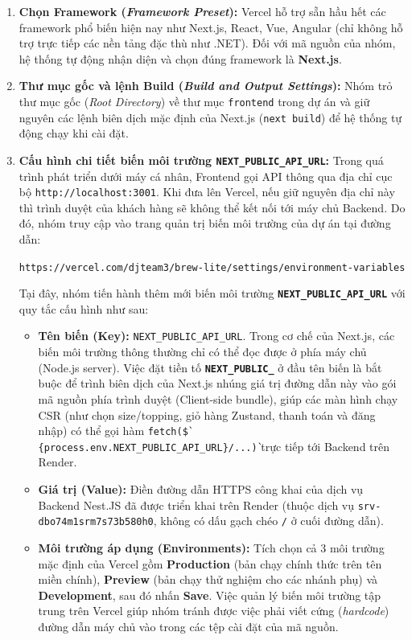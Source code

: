 \begin{enumerate}
    \item \textbf{Chọn Framework (\textit{Framework Preset}):} Vercel hỗ trợ sẵn hầu hết các framework phổ biến hiện nay như Next.js, React, Vue, Angular (chỉ không hỗ trợ trực tiếp các nền tảng đặc thù như .NET). Đối với mã nguồn của nhóm, hệ thống tự động nhận diện và chọn đúng framework là \textbf{Next.js}.
    \item \textbf{Thư mục gốc và lệnh Build (\textit{Build and Output Settings}):} Nhóm trỏ thư mục gốc (\textit{Root Directory}) về thư mục \texttt{frontend} trong dự án và giữ nguyên các lệnh biên dịch mặc định của Next.js (\texttt{next build}) để hệ thống tự động chạy khi cài đặt.
    \item \textbf{Cấu hình chi tiết biến môi trường \texttt{NEXT\_PUBLIC\_API\_URL}:}
    Trong quá trình phát triển dưới máy cá nhân, Frontend gọi API thông qua địa chỉ cục bộ \texttt{http://localhost:3001}. Khi đưa lên Vercel, nếu giữ nguyên địa chỉ này thì trình duyệt của khách hàng sẽ không thể kết nối tới máy chủ Backend. Do đó, nhóm truy cập vào trang quản trị biến môi trường của dự án tại đường dẫn:
    \begin{center}
    \texttt{https://vercel.com/djteam3/brew-lite/settings/environment-variables}
    \end{center}
    Tại đây, nhóm tiến hành thêm mới biến môi trường \textbf{\texttt{NEXT\_PUBLIC\_API\_URL}} với quy tắc cấu hình như sau:
    \begin{itemize}
        \item \textbf{Tên biến (Key):} \texttt{NEXT\_PUBLIC\_API\_URL}. Trong cơ chế của Next.js, các biến môi trường thông thường chỉ có thể đọc được ở phía máy chủ (Node.js server). Việc đặt tiền tố \textbf{\texttt{NEXT\_PUBLIC\_}} ở đầu tên biến là bắt buộc để trình biên dịch của Next.js nhúng giá trị đường dẫn này vào gói mã nguồn phía trình duyệt (Client-side bundle), giúp các màn hình chạy CSR (như chọn size/topping, giỏ hàng Zustand, thanh toán và đăng nhập) có thể gọi hàm \texttt{fetch(\`\$\{process.env.NEXT\_PUBLIC\_API\_URL\}/...\`)} trực tiếp tới Backend trên Render.
        \item \textbf{Giá trị (Value):} Điền đường dẫn HTTPS công khai của dịch vụ Backend Nest.JS đã được triển khai trên Render (thuộc dịch vụ \texttt{srv-dbo74m1srm7s73b580h0}, không có dấu gạch chéo \texttt{/} ở cuối đường dẫn).
        \item \textbf{Môi trường áp dụng (Environments):} Tích chọn cả 3 môi trường mặc định của Vercel gồm \textbf{Production} (bản chạy chính thức trên tên miền chính), \textbf{Preview} (bản chạy thử nghiệm cho các nhánh phụ) và \textbf{Development}, sau đó nhấn \textbf{Save}. Việc quản lý biến môi trường tập trung trên Vercel giúp nhóm tránh được việc phải viết cứng (\textit{hardcode}) đường dẫn máy chủ vào trong các tệp cài đặt của mã nguồn.
    \end{itemize}
\end{enumerate}

